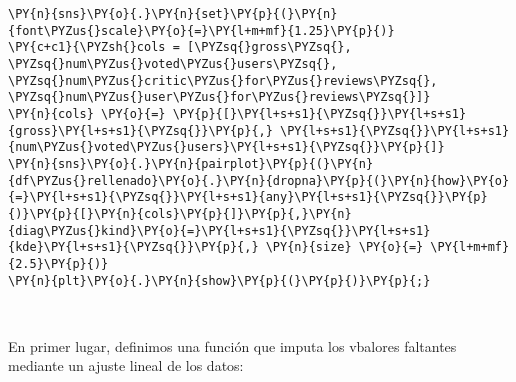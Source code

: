     \begin{tcolorbox}[breakable, size=fbox, boxrule=1pt, pad at break*=1mm,colback=cellbackground, colframe=cellborder]
\begin{Verbatim}[commandchars=\\\{\}]
\PY{n}{sns}\PY{o}{.}\PY{n}{set}\PY{p}{(}\PY{n}{font\PYZus{}scale}\PY{o}{=}\PY{l+m+mf}{1.25}\PY{p}{)}
\PY{c+c1}{\PYZsh{}cols = [\PYZsq{}gross\PYZsq{}, \PYZsq{}num\PYZus{}voted\PYZus{}users\PYZsq{}, \PYZsq{}num\PYZus{}critic\PYZus{}for\PYZus{}reviews\PYZsq{}, \PYZsq{}num\PYZus{}user\PYZus{}for\PYZus{}reviews\PYZsq{}]}
\PY{n}{cols} \PY{o}{=} \PY{p}{[}\PY{l+s+s1}{\PYZsq{}}\PY{l+s+s1}{gross}\PY{l+s+s1}{\PYZsq{}}\PY{p}{,} \PY{l+s+s1}{\PYZsq{}}\PY{l+s+s1}{num\PYZus{}voted\PYZus{}users}\PY{l+s+s1}{\PYZsq{}}\PY{p}{]}
\PY{n}{sns}\PY{o}{.}\PY{n}{pairplot}\PY{p}{(}\PY{n}{df\PYZus{}rellenado}\PY{o}{.}\PY{n}{dropna}\PY{p}{(}\PY{n}{how}\PY{o}{=}\PY{l+s+s1}{\PYZsq{}}\PY{l+s+s1}{any}\PY{l+s+s1}{\PYZsq{}}\PY{p}{)}\PY{p}{[}\PY{n}{cols}\PY{p}{]}\PY{p}{,}\PY{n}{diag\PYZus{}kind}\PY{o}{=}\PY{l+s+s1}{\PYZsq{}}\PY{l+s+s1}{kde}\PY{l+s+s1}{\PYZsq{}}\PY{p}{,} \PY{n}{size} \PY{o}{=} \PY{l+m+mf}{2.5}\PY{p}{)}
\PY{n}{plt}\PY{o}{.}\PY{n}{show}\PY{p}{(}\PY{p}{)}\PY{p}{;}
\end{Verbatim}
\end{tcolorbox}

    \begin{center}
    \end{center}
    { \hspace*{\fill} \\}
    
    En primer lugar, definimos una función que imputa los vbalores faltantes
mediante un ajuste lineal de los datos:

